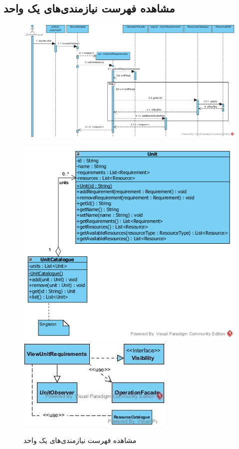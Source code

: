 \begin{landscape}
\section{مشاهده فهرست نیازمندی‌های یک واحد}
\begin{figure}[H]
	\centering
	\includegraphics[scale=0.8]{img/sequence-design/ViewListOfRequirements}
\end{figure}
\begin{figure}[H]
	\centering
	\includegraphics[scale=0.8]{img/sequence-design/ViewListOfRequirementsC}
	\includegraphics[scale=0.8]{img/sequence-design/ViewListOfRequirementsUI}
	\caption{مشاهده فهرست نیازمندی‌های یک واحد}
\end{figure}


\end{landscape}
